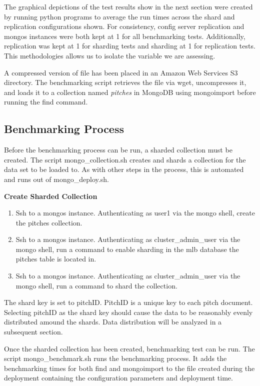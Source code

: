 \documentclass[9pt,twocolumn,twoside]{../../styles/osajnl}
\begin{document}
The graphical depictions of the test results show in the next section were created by running python programs to average the run times across the shard and replication configurations shown.  For consistency, config server replication and mongos instances were both kept at 1 for all benchmarking tests.  Additionally, replication was kept at 1 for sharding tests and sharding at 1 for replication tests.  This methodologies allows us to isolate the variable we are assessing.



A compressed version of file has been placed in an Amazon Web Services S3 directory.  The benchmarking script retrieves the file via wget, uncompresses it, and loads it to a collection named \emph{pitches} in MongoDB using mongoimport before running the find command.


\subsection{Benchmarking Process}

Before the benchmarking process can be run, a sharded collection must be created.  The script mongo\_collection.sh creates and shards a collection for the data set to be loaded to.  As with other steps in the process, this is automated and runs out of mongo\_deploy.sh.

\textbf{Create Sharded Collection}

\begin{enumerate}
\item Ssh to a mongos instance.  Authenticating as user1 via the mongo shell, create the pitches collection.
\item Ssh to a mongos instance.  Authenticating as cluster\_admin\_user via the mongo shell, run a command to enable sharding in the mlb database the pitches table is located in.
\item Ssh to a mongos instance.  Authenticating as cluster\_admin\_user via the mongo shell, run a command to shard the collection.  
\end{enumerate}

The shard key is set to pitchID.  PitchID is a unique key to each pitch document.  Selecting pitchID as the shard key should cause the data to be reasonably evenly distributed amound the shards.  Data distribution will be analyzed in a subsequent section.

Once the sharded collection has been created, benchmarking test can be run.  The script mongo\_benchmark.sh runs the benchmarking process.  It adds the benchmarking times for both find and mongoimport to the file created during the deployment containing the configuration parameters and deployment time.
\end{document}
